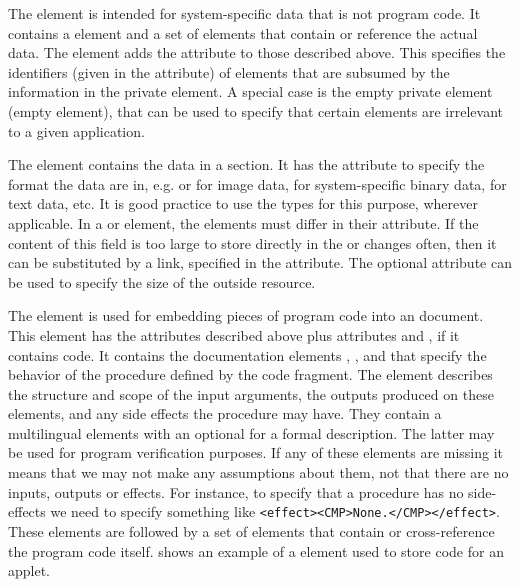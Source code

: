 The {} element is intended for system-specific data that is not
program code. It contains a {} element and a set of
{} elements that contain or reference the actual data. The
{} element adds the {} attribute to
those described above. This specifies the identifiers (given in the
{} attribute) of {\omdoc} elements that are subsumed
by the information in the private element. A special case is the empty private
element (empty {} element), that can be used to specify that certain
{\omdoc} elements are irrelevant to a given application.

The {} element contains the data in a {} section.  It has
the attribute {} to specify the format the data are in,
e.g.  {} or {} for image data, {}
for system-specific binary data, {} for text data, etc. It is
good practice to use the {} types for this purpose, wherever
applicable. In a {} or {} element, the
{} elements must differ in their {}
attribute. If the content of this field is too large to store directly in the
{\omdoc} or changes often, then it can be substituted by a link, specified in the
{} attribute. The optional {}
attribute can be used to specify the size of the outside resource.

The {} element is used for embedding pieces of program code into an
{\omdoc} document. This element has the attributes described above plus attributes
{} and {}, if it contains
{} code. It contains the documentation elements {},
{}, and {} that specify the behavior of the procedure
defined by the code fragment. The {} element describes the
structure and scope of the input arguments, {} the outputs
produced on these elements, and {} any side effects the procedure
may have.  They contain a multilingual {} elements with an optional
{} for a formal description. The latter may be used for program
verification purposes. If any of these elements are missing it means that we may
not make any assumptions about them, not that there are no inputs, outputs or
effects. For instance, to specify that a procedure has no side-effects we need to
specify something like {\tt{<effect><CMP>None.</CMP></effect>}}. These elements
are followed by a set of {} elements that contain or cross-reference
the program code itself. {} shows an example of a
{} element used to store {} code for an applet.

